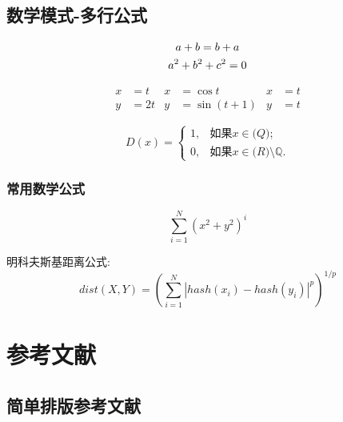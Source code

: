 \documentclass[]{ctexart}
\begin{document}
 	\subsection{数学模式-多行公式}
 	\begin{gather}
 		a + b = b + a \notag \\    %
 		a^2 + b^2 + c^2 =0 
 	\end{gather}
 	
 	\begin{align}
 		x  &= t & x &=\cos t & x &=t \\
 		y & = 2t & y &=\sin(t+1) & y &= t 
 	\end{align}
 	
 	\begin{equation}
 		D(x) = \begin{cases}
 			1, & \text{如果} x \in \mathbb(Q); \\
 			0, & \text{如果} x \in \mathbb(R) \setminus \mathbb{Q}.
 		\end{cases}
 	\end{equation}
 	
 	\subsubsection{常用数学公式}
 	\[
 		\sum_{i=1}^{N}(x^2 + y^2)^{i}
 	\]
 	
 	明科夫斯基距离公式:
 	\begin{equation} 		
 		dist(X,Y) = (\sum_{i=1}^{N}|hash(x_i) - hash(y_i)|^p)^{1/p}
 	\end{equation}
 	 	
 	 	
 	 
 	\section{参考文献}
 	\subsection{简单排版参考文献}
 	
\end{document}
